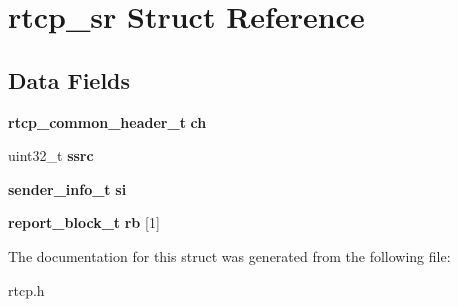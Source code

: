 \section{rtcp\+\_\+sr Struct Reference}
\label{structrtcp__sr}
\subsection*{Data Fields}
\begin{DoxyCompactItemize}
\item 
\mbox{\label{structrtcp__sr_a9386542bcf761b86b0b8fcfdb478c6bd}} 
\textbf{ rtcp\+\_\+common\+\_\+header\+\_\+t} {\bfseries ch}
\item 
\mbox{\label{structrtcp__sr_adf35677d270d8029a91686e475bf1b66}} 
uint32\+\_\+t {\bfseries ssrc}
\item 
\mbox{\label{structrtcp__sr_af3909c694b31bf81249a4823d292e280}} 
\textbf{ sender\+\_\+info\+\_\+t} {\bfseries si}
\item 
\mbox{\label{structrtcp__sr_ab46c925c71a851dec5817f89994f74b3}} 
\textbf{ report\+\_\+block\+\_\+t} {\bfseries rb} [1]
\end{DoxyCompactItemize}


The documentation for this struct was generated from the following file\+:\begin{DoxyCompactItemize}
\item 
rtcp.\+h\end{DoxyCompactItemize}
